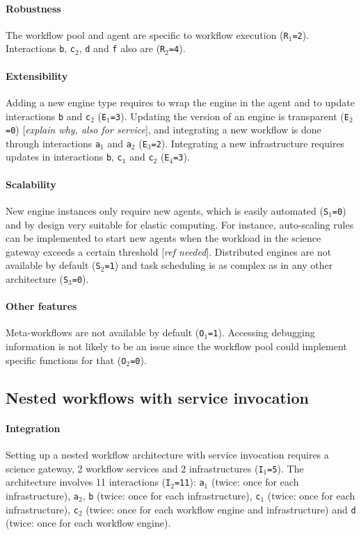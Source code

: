 \documentclass[preprint,3p,twocolumn]{elsarticle}
\newcommand{\todo}[1]{\color{blue}\xspace[\emph{#1}]\xspace\color{black}}
\begin{document}
\paragraph{Robustness} The workflow pool and agent are specific to
workflow execution (\texttt{R$_1$=2}). Interactions \texttt{b},
\texttt{c$_2$}, \texttt{d} and \texttt{f} also are (\texttt{R$_2$=4}).

\paragraph{Extensibility} Adding a new engine type requires to wrap
the engine in the agent and to update interactions \texttt{b} and
\texttt{c$_2$} (\texttt{E$_1$=3}). Updating the version of an engine
is transparent (\texttt{E$_2$=0}) \todo{explain why, also for service}, and integrating a new workflow is
done through interactions \texttt{a$_1$} and \texttt{a$_2$}
(\texttt{E$_3$=2}). Integrating a new infrastructure requires updates
in interactions \texttt{b}, \texttt{c$_1$} and \texttt{c$_2$}
(\texttt{E$_4$=3}).

\paragraph{Scalability} New engine instances only require new agents,
which is easily automated (\texttt{S$_1$=0}) and by design very
suitable for elastic computing. For instance, auto-scaling rules can
be implemented to start new agents when the workload in the science
gateway exceeds a certain threshold \todo{ref needed}. Distributed
engines are not available by default (\texttt{S$_2$=1}) and task
scheduling is as complex as in any other architecture
(\texttt{S$_3$=0}).

\paragraph{Other features} Meta-workflows are not available by default
(\texttt{O$_1$=1}).  Accessing debugging information is not likely to
be an issue since the workflow pool could implement specific functions
for that (\texttt{O$_2$=0}).

\subsection{Nested workflows with service invocation}

\paragraph{Integration} Setting up a nested workflow architecture with
service invocation requires a science gateway, 2 workflow services and
2 infrastructures (\texttt{I$_1$=5}). The architecture involves 11
interactions (\texttt{I$_2$=11}): \texttt{a$_1$} (twice: once for each
infrastructure), \texttt{a$_2$}, \texttt{b} (twice: once for each
infrastructure), \texttt{c$_1$} (twice: once for each infrastructure),
\texttt{c$_2$} (twice: once for each workflow engine and
infrastructure) and \texttt{d} (twice: once for each workflow engine).
\end{document}

